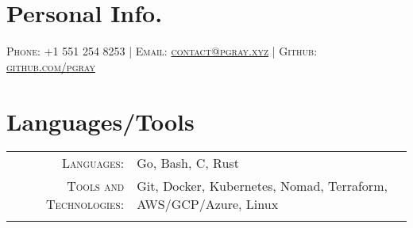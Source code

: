 \documentclass[a4paper, 10pt, onepage]{article} %
\begin{document}
\pagestyle{empty} 
\par{\par}
\par{\par}

\section{Personal Info.}
\centering\textsc{{Phone:} +1 551 254 8253 | {Email:}  \href{mailto:contact@pgray.xyz}{contact@pgray.xyz} | {Github:}  \href{http://github.com/pgray}{github.com/pgray}}\\

\section{Languages/Tools}
\begin{tabular}{rp{10cm}}
\textsc{Languages:} & Go, Bash, C, Rust\\
\textsc{Tools and Technologies:} & Git, Docker, Kubernetes, Nomad, Terraform, AWS/GCP/Azure, Linux\\
\multicolumn{2}{c}{}\\
\end{tabular}
\end{document}
